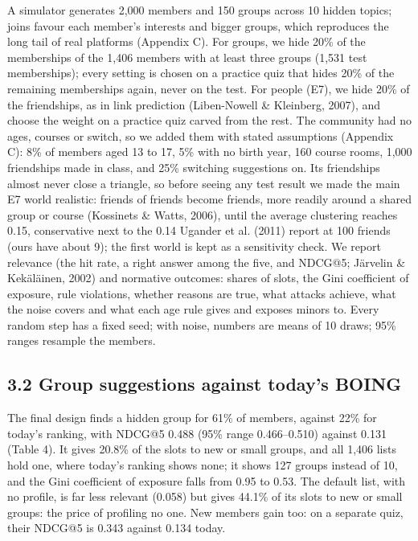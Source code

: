 \documentclass[11pt,letterpaper]{article}
\begin{document}
A simulator generates 2,000 members and 150 groups across 10 hidden topics; joins favour each member's
interests and bigger groups, which reproduces the long tail of real platforms (Appendix C). For groups, we
hide 20\% of the memberships of the 1,406 members with at least three groups (1,531 test memberships); every
setting is chosen on a practice quiz that hides 20\% of the remaining memberships again, never on the test.
For people (E7), we hide 20\% of the friendships, as in link prediction (Liben-Nowell \& Kleinberg, 2007), and
choose the weight on a practice quiz carved from the rest. The community had no ages, courses or switch, so we
added them with stated assumptions (Appendix C): 8\% of members aged 13 to 17, 5\% with no birth year, 160
course rooms, 1,000 friendships made in class, and 25\% switching suggestions on. Its friendships almost never
close a triangle, so before seeing any test result we made the main E7 world realistic: friends of friends
become friends, more readily around a shared group or course (Kossinets \& Watts, 2006), until the average
clustering reaches 0.15, conservative next to the 0.14 Ugander et al. (2011) report at 100 friends (ours have
about 9); the first world is kept as a sensitivity check. We report relevance (the hit rate, a right answer
among the five, and NDCG@5; Järvelin \& Kekäläinen, 2002) and normative outcomes: shares of slots, the Gini
coefficient of exposure, rule violations, whether reasons are true, what attacks achieve, what the noise
covers and what each age rule gives and exposes minors to. Every random step has a fixed seed; with noise,
numbers are means of 10 draws; 95\% ranges resample the members.

\subsection{3.2 Group suggestions against today's BOING}

The final design finds a hidden group for 61\% of members, against 22\% for today's ranking, with NDCG@5 0.488
(95\% range 0.466--0.510) against 0.131 (Table 4). It gives 20.8\% of the slots to new or small groups, and
all 1,406 lists hold one, where today's ranking shows none; it shows 127 groups instead of 10, and the Gini
coefficient of exposure falls from 0.95 to 0.53. The default list, with no profile, is far less relevant
(0.058) but gives 44.1\% of its slots to new or small groups: the price of profiling no one. New members gain
too: on a separate quiz, their NDCG@5 is 0.343 against 0.134 today.
\end{document}
